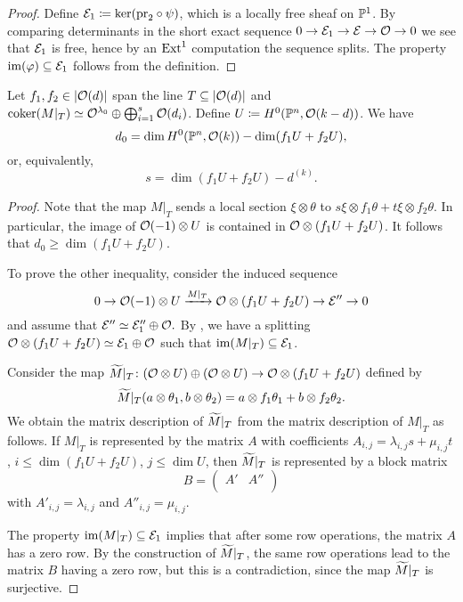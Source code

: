 \begin{proof}
	Define $\mathcal{E}_1 \coloneqq \ker(\mathrm{pr}_2\circ\psi)$, which is a locally free sheaf on $\mathbb{P}^1$. By comparing determinants in the short exact sequence $0 \to \mathcal{E}_1 \to \mathcal{E} \to \mathcal{O} \to 0$ we see that $\mathcal{E}_1$ is free, hence by an $\operatorname{Ext}^1$ computation the sequence splits. The property $\operatorname{im}(\varphi) \subseteq \mathcal{E}_1$ follows from the definition.
\end{proof}

\begin{proposition} \label{number-zeroes}
	Let $f_1, f_2 \in \lvert\mathcal{O}(d)\rvert$ span the line
	$T \subseteq \lvert\mathcal{O}(d)\rvert$ and $\operatorname{coker}(M|_{T}) \simeq \mathcal{O}^{\lambda_0}
	\oplus \bigoplus_{i=1}^s \mathcal{O}(d_i)$. Define $U\coloneqq H^0(\mathbb{P}^n,\mathcal{O}(k-d))$. We have $$d_0 = \dim H^0(\mathbb{P}^n,\mathcal{O}(k)) - \dim ({f_1 U + f_2 U}),$$
	or, equivalently,
	\[
		s = \dim({f_1 U + f_2 U}) - d^{(k)}.
	\]
\end{proposition}

\begin{proof}
	Note that the map $M|_T$ sends a local section $\xi \otimes \theta$ to $s\xi \otimes f_1 \theta + t\xi \otimes f_2 \theta$. In particular, the image of $\mathcal{O}(-1)\otimes U$ is contained in $\mathcal{O} \otimes (f_1 U + f_2 U)$. It follows that $d_0 \geq \dim ({f_1 U + f_2 U})$.

  To prove the other inequality, consider the induced sequence
  \[
  	0 \to \mathcal{O}(-1)\otimes U \xrightarrow{M|_T} \mathcal{O}\otimes (f_1 U + f_2 U) \to \mathcal{E}'' \to 0
  \]
  and assume that $\mathcal{E}'' \simeq \mathcal{E}_1''\oplus \mathcal{O}.$ By , we have a splitting $\mathcal{O}\otimes (f_1 U + f_2 U) \simeq \mathcal{E}_1 \oplus \mathcal{O}$ such that $\operatorname{im}(M|_T) \subseteq \mathcal{E}_1$. 

  Consider the map
  $\widetilde M|_T \colon (\mathcal{O} \otimes U) \oplus (\mathcal{O} \otimes U) \to \mathcal{O} \otimes (f_1 U + f_2 U)$
  defined by $$\widetilde M|_T(a\otimes \theta_1,b \otimes \theta_2)=a\otimes f_1 \theta_1 + b \otimes f_2 \theta_2.$$
  We obtain the matrix description of $\widetilde M|_T$ from the matrix description of $M|_T$ as follows. If $M|_T$ is represented by the matrix $A$ with coefficients $A_{i,j} = \lambda_{i,j} s + \mu_{i,j} t$, $i\leq \dim (f_1 U + f_2 U)$, $j\leq \dim U$, then $\widetilde M|_T$ is represented by a block matrix
  \[
  	B = \left(
  		\begin{array}{c|c}
  			A' & A'' \\
  		\end{array}
  	\right)
  \]
  with $A'_{i,j} = \lambda_{i,j}$ and $A''_{i,j} = \mu_{i,j}$.

  The property $\operatorname{im}(M|_T)\subseteq \mathcal{E}_1$ implies that after some row operations, the matrix $A$ has a zero row. By the construction of $\widetilde M|_T$, the same row operations lead to the matrix $B$ having a zero row, but this is a contradiction, since the map $\widetilde M|_T$ is surjective.
\end{proof}

